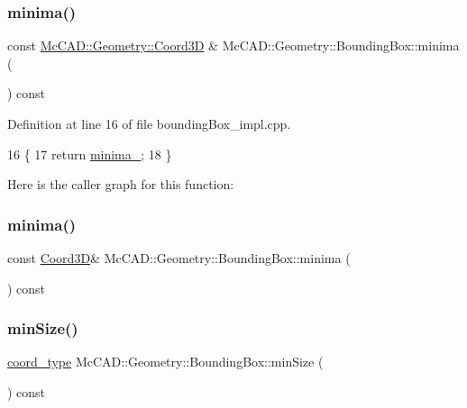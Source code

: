\subsubsection{\texorpdfstring{minima()}{minima()}\hspace{0.1cm}{\footnotesize\ttfamily [1/2]}}
{\footnotesize\ttfamily const \hyperlink{classMcCAD_1_1Geometry_1_1Coord3D}{Mc\+C\+A\+D\+::\+Geometry\+::\+Coord3D} \& Mc\+C\+A\+D\+::\+Geometry\+::\+Bounding\+Box\+::minima (\begin{DoxyParamCaption}{ }\end{DoxyParamCaption}) const}



Definition at line 16 of file bounding\+Box\+\_\+impl.\+cpp.


\begin{DoxyCode}
16                                       \{
17     \textcolor{keywordflow}{return} \hyperlink{classMcCAD_1_1Geometry_1_1BoundingBox_a2fbfb7dc1c01528377da86ff313fc6e6}{minima\_};
18 \}
\end{DoxyCode}
Here is the caller graph for this function\+:
\mbox{\label{classMcCAD_1_1Geometry_1_1BoundingBox_a9e1e0e801553cdabc4e5e370badd5e22}} 
\subsubsection{\texorpdfstring{minima()}{minima()}\hspace{0.1cm}{\footnotesize\ttfamily [2/2]}}
{\footnotesize\ttfamily const \hyperlink{classMcCAD_1_1Geometry_1_1Coord3D}{Coord3D}\& Mc\+C\+A\+D\+::\+Geometry\+::\+Bounding\+Box\+::minima (\begin{DoxyParamCaption}{ }\end{DoxyParamCaption}) const}

\mbox{\label{classMcCAD_1_1Geometry_1_1BoundingBox_aa9ebd35538bff8861f199f37c34e086b}} 
\subsubsection{\texorpdfstring{min\+Size()}{minSize()}\hspace{0.1cm}{\footnotesize\ttfamily [1/2]}}
{\footnotesize\ttfamily \hyperlink{namespaceMcCAD_1_1Geometry_ac043b37a4a7e849fca22869e1982d2f8}{coord\+\_\+type} Mc\+C\+A\+D\+::\+Geometry\+::\+Bounding\+Box\+::min\+Size (\begin{DoxyParamCaption}{ }\end{DoxyParamCaption}) const}

